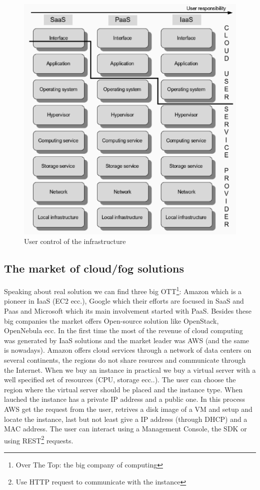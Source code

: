 \begin{figure}[h]
    \centering
    \includegraphics[scale=0.3]{images/XaaS.png}
    \caption{User control of the infrastructure}
    \label{fig:XaaS}
\end{figure}
\subsection{The market of cloud/fog solutions}
Speaking about real solution we can find three big OTT\footnote{Over The Top: the big company of computing}: Amazon which is a pioneer in IaaS (EC2 ecc.), Google which their efforts are focused in SaaS and Paas and Microsoft which its main involvement started with PaaS. Besides these big companies the market offers Open-source solution like OpenStack, OpenNebula ecc. In the first time the most of the revenue of cloud computing was generated by IaaS solutions and the market leader was AWS (and the same is nowadays). Amazon offers cloud services through a network of data centers on several continents, the regions do not share resurces and communicate through the Internet. When we buy an instance in practical we buy a virtual server with a well specified set of resources (CPU, storage ecc..). The user can choose the region where the virtual server should be placed and the instance type. When lauched the instance has a private IP address and a public one. In this process AWS get the request from the user, retrives a disk image of a VM and setup and locate the instance, last but not least give a IP address (through DHCP) and a MAC address. The user can interact using a Management Console, the SDK or using REST\footnote{Use HTTP request to communicate with the instance} requests.
